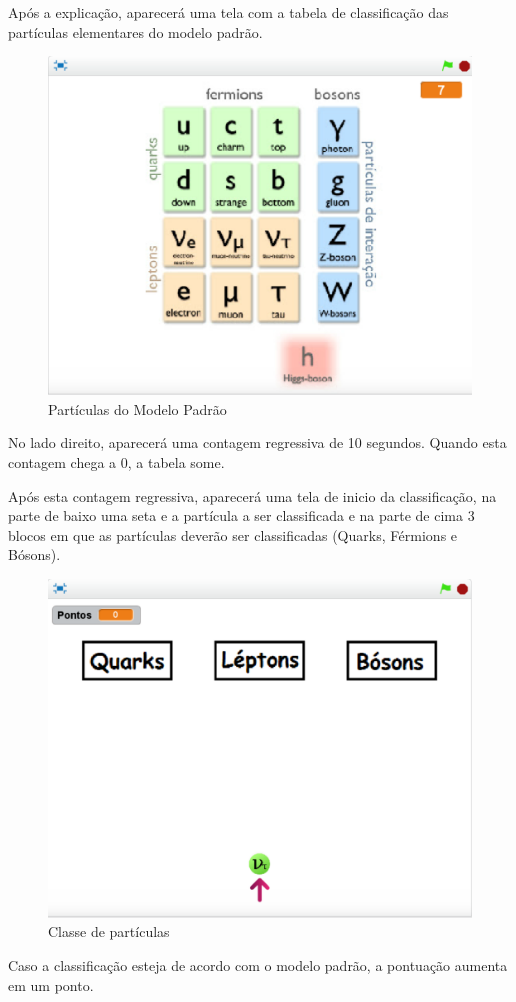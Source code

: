 \documentclass[12pt,fleqn]{book} %
\begin{document}
\newpage

Após a explicação, aparecerá uma tela com a tabela de classificação das partículas elementares do modelo padrão.

\begin{figure}[h]
	\centering
	\includegraphics[width=0.65 \textwidth]{Produto/class2}
	\caption{Partículas do Modelo Padrão}
	\label{fig:app_a:class2}
\end{figure}

No lado direito, aparecerá uma contagem regressiva de 10 segundos. Quando esta contagem chega a 0, a tabela some.

Após esta contagem regressiva, aparecerá uma tela de inicio da classificação, na parte de baixo uma seta e a partícula a ser classificada e na parte de cima 3 blocos em que as partículas deverão ser classificadas (Quarks, Férmions e Bósons).

\begin{figure}[h]
	\centering
	\includegraphics[width=0.63 \textwidth]{Produto/class3}
	\caption{Classe de partículas}
	\label{fig:app_a:class3}
\end{figure}

\newpage

Caso a classificação esteja de acordo com o modelo padrão, a pontuação aumenta em um ponto.
\end{document}
